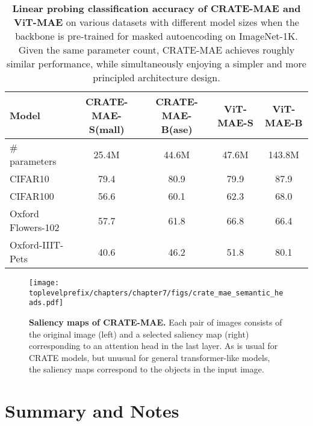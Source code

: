 \documentclass[../../book-main.tex]{subfiles}
\begin{document}
\begin{table}
    \centering 
    \begin{tabular}{@{}lcc|cc@{}}
        \toprule 
        \textbf{Model} & CRATE-MAE-S(mall) & CRATE-MAE-B(ase) & {\color{gray} ViT-MAE-S} & {\color{gray} ViT-MAE-B} \\
        \midrule
        \midrule
        \# parameters & 25.4M & 44.6M & 47.6M & {\color{gray}143.8M} \\
        \midrule
        CIFAR10 & 79.4 & 80.9 & {\color{gray} 79.9} & {\color{gray} 87.9} \\
        CIFAR100 & 56.6 & 60.1 & {\color{gray} 62.3} & {\color{gray} 68.0} \\
        Oxford Flowers-102 & 57.7 & 61.8 & {\color{gray} 66.8} & {\color{gray} 66.4} \\
        Oxford-IIIT-Pets & 40.6 & 46.2 & {\color{gray} 51.8} & {\color{gray} 80.1} \\
        \bottomrule
    \end{tabular}
    \caption{\small\textbf{Linear probing classification accuracy of CRATE-MAE and ViT-MAE} on various datasets with different model sizes when the backbone is pre-trained for masked autoencoding on ImageNet-1K. Given the same parameter count, CRATE-MAE achieves roughly similar performance, while simultaneously enjoying a simpler and more principled architecture design.}
    \label{tab:crate_mae_linear_probing}
\end{table}

\begin{figure}
    \centering 
    \texttt{[image: \\toplevelprefix/chapters/chapter7/figs/crate\_mae\_semantic\_heads.pdf]}
    \caption{\small\textbf{Saliency maps of CRATE-MAE.} Each pair of images consists of the original image (left) and a selected saliency map (right) corresponding to an attention head in the last layer. As is usual for CRATE models, but unusual for general transformer-like models, the saliency maps correspond to the objects in the input image.}
    \label{fig:crate_mae_semantic_heads}
\end{figure}





\section{Summary and Notes}
\end{document}
